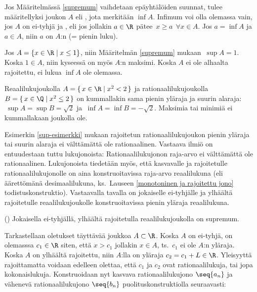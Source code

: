 Jos Määritelmässä \ref{supremum} vaihdetaan epäyhtälöiden suunnat, tulee määritellyksi joukon 
$A$  eli , jota merkitään $\inf A$. Infimum voi olla olemassa
%
vain, jos $A$ on ei-tyhjä ja , eli jos jollakin $a \in \R$ pätee 
%
$\,x \ge a\ \ \forall x \in A$. Jos $a=\inf A$ ja $a \in A$, niin $a$ on $A$:n  
(= pienin luku).
\begin{Exa} Jos $A = \{x \in \R \mid x \le 1\}$, niin Määritelmän \ref{supremum} mukaan 
$\ \sup A = 1$. Koska $1 \in A$, niin kyseessä on myös $A$:n maksimi. Koska $A$ ei ole alhaalta
rajoitettu, ei lukua $\inf A$ ole olemassa. 
\end{Exa}
\begin{Exa} \label{sup-esimerkki} Reaalilukujoukolla $A = \{\,x \in \R \mid x^2 < 2\,\}$ ja 
rationaalilukujoukolla $B = \{\,x \in \Q \mid x^2 \le 2\,\}$ on kummallakin sama pienin yläraja
ja suurin alaraja: $\ \sup A = \sup B = \sqrt{2}$ ja $\ \inf A = \inf B = -\sqrt{2}$. Maksimia
tai minimiä ei kummallakaan joukolla ole. \loppu 
\end{Exa}
Esimerkin \ref{sup-esimerkki} mukaan rajoitetun rationaalilukujoukon pienin yläraja tai suurin
alaraja ei välttämättä ole rationaalinen. Vastaava ilmiö on entuudestaan tuttu lukujonoista:
Rationaalilukujonon raja-arvo ei välttämättä ole rationaalinen. Lukujonoista tiedetään myös,
että kasvavalle ja rajoitetulle rationaalilukujonolle on aina konstruoitavissa raja-arvo 
reaalilukuna (eli äärettömänä desimaalilukuna, ks.\ Lauseen \ref{monotoninen ja rajoitettu jono}
todistuskonstruktio). Vastaavalla tavalla on jokaiselle ei-tyhjälle ja ylhäältä rajoitetulle
reaalilukujoukolle konstruoitavissa pienin yläraja reaalilukuna.
\begin{*Lause} () \label{supremum-lause} Jokaisella ei-tyhjällä, ylhäältä
rajoitetulla reaalilukujoukolla on supremum. 
\end{*Lause}
\tod Tarkastellaan oletukset täyttävää joukkoa $A \subset \R$. Koska $A$ on ei-tyhjä, on
olemasssa $c_1 \in \R$ siten, että $x>c_1$ jollakin $x \in A$, ts.\ $c_1$ ei ole $A$:n yläraja.
Koska $A$ on ylhäältä rajoitettu, niin $A$:lla on yläraja $c_2 = c_1 + L \in \R$. Yleisyyttä 
rajoittamatta voidaan edelleen olettaa, että $c_1$ ja $c_2$ ovat rationaalilukuja, tai jopa 
kokonaislukuja. Konstruoidaan nyt kasvava rationaalilukujono $\seq{a_n}$ ja vähenevä 
rationaalilukujono $\seq{b_n}$ puolituskonstruktiolla seuraavasti:
